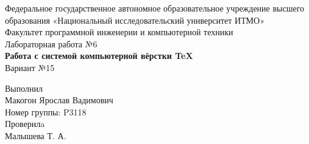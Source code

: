 
\fontsize{15}{15pt}\selectfont 
\begin{center}
Федеральное государственное автономное образовательное учреждение высшего \\образования «Национальный исследовательский университет ИТМО»\\
Факультет программной инженерии и компьютерной техники\\
\vspace{7cm}
Лабораторная работа №6\\
\large{\textbf{Работа с системой
компьютерной вёрстки \TeX
}}\\
\fontsize{13}{13pt}\selectfont 
Вариант №15\\

\vspace{7cm}
\end{center}
\begin{flushright}
Выполнил \\
Макогон Ярослав Вадимович \\
Номер группы: P3118\\
Проверилa\\
Малышева Т. А.\\

\end{flushright}

